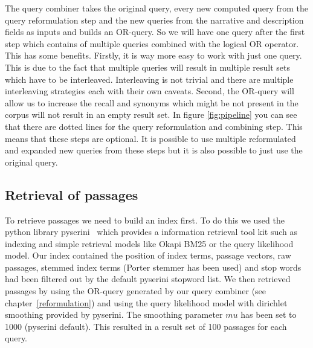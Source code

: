         The query combiner takes the original query, every new computed query from the query reformulation step and the new queries from the narrative and description fields as inputs and builds an OR-query. So we will have one query after the first step which contains of multiple queries combined with the logical OR operator. This has some benefits. Firstly, it is way more easy to work with just one query. This is due to the fact that multiple queries will result in multiple result sets which have to be interleaved. Interleaving is not trivial and there are multiple interleaving strategies each with their own caveats. Second, the OR-query will allow us to increase the recall and synonyms which might be not present in the corpus will not result in an empty result set. In figure \ref{fig:pipeline} you can see that there are dotted lines for the query reformulation and combining step. This means that these steps are optional. It is possible to use multiple reformulated and expanded new queries from these steps but it is also possible to just use the original query.
    \subsection{Retrieval of passages}
        To retrieve passages we need to build an index first. To do this we used the python library pyserini~\cite{LinMLYPN2021} which provides a information retrieval tool kit such as indexing and simple retrieval models like Okapi BM25 or the query likelihood model. Our index contained the position of index terms, passage vectors, raw passages, stemmed index terms (Porter stemmer has been used) and stop words had been filtered out by the default pyserini stopword list. We then retrieved passages by using the OR-query generated by our query combiner (see chapter~\ref{reformulation}) and using the query likelihood model with dirichlet smoothing provided by pyserini. The smoothing parameter $mu$ has been set to 1000 (pyserini default). This resulted in a result set of 100 passages for each query.
